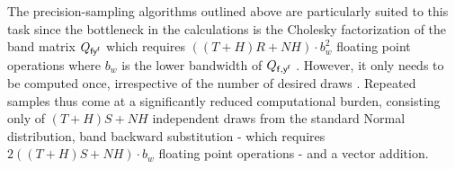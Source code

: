 \documentclass[notitlepage,a4paper,12pt]{article}
\begin{document}
The precision-sampling algorithms outlined above are particularly suited to this task since the bottleneck in the calculations is the Cholesky factorization of the band matrix $Q_{\sf{f} y^{\sf{f}}}$ which requires $((T+H)R+NH)\cdot b_w^2$ floating point operations where $b_w$ is the lower bandwidth of $Q_{\sf{f}, y^{\sf{f}}}$ \citep[][4.3.5]{GolubvanLoan2013}. However, it only needs to be computed once, irrespective of the number of desired draws \citep{rue2001_jrss}. Repeated samples thus come at a significantly reduced computational burden, consisting only of $(T+H)S+NH$ independent draws from the standard Normal distribution, band backward substitution - which requires $2 ((T+H)S+NH) \cdot b_w$ floating point operations \citep[][4.3.2]{GolubvanLoan2013}- and a vector addition. 



\end{document}
